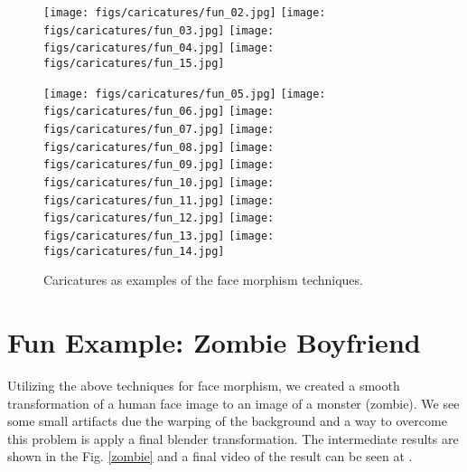 \documentclass[11pt]{article}
\begin{document}
\begin{figure}[H]
\begin{center}
\texttt{[image: figs/caricatures/fun\_02.jpg]}  
\texttt{[image: figs/caricatures/fun\_03.jpg]}  
\texttt{[image: figs/caricatures/fun\_04.jpg]}  
\texttt{[image: figs/caricatures/fun\_15.jpg]} 


 \end{center}
\end{figure}
\begin{figure}[H]
\begin{center}
\texttt{[image: figs/caricatures/fun\_05.jpg]}  
\texttt{[image: figs/caricatures/fun\_06.jpg]}  
\texttt{[image: figs/caricatures/fun\_07.jpg]}  
\texttt{[image: figs/caricatures/fun\_08.jpg]}  
\texttt{[image: figs/caricatures/fun\_09.jpg]}  
\texttt{[image: figs/caricatures/fun\_10.jpg]} 
\texttt{[image: figs/caricatures/fun\_11.jpg]}  
\texttt{[image: figs/caricatures/fun\_12.jpg]}  
\texttt{[image: figs/caricatures/fun\_13.jpg]}  
\texttt{[image: figs/caricatures/fun\_14.jpg]}
    
\caption{Caricatures as examples of the face morphism techniques.}
\label{mean-me}
\end{center}
\end{figure}

\newpage

\section{Fun Example: Zombie Boyfriend}

Utilizing the above techniques for face morphism, we created a smooth transformation of a human face image to an image of  a monster (zombie). We see some small artifacts due the warping of the background and a way to overcome this problem is apply a final blender transformation. The intermediate results are shown in the Fig. \ref{zombie} and a final video of the result can be seen at \cite{video-zombie}.

\quad
\end{document}
